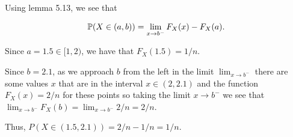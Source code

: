 

Using lemma 5.13, we see that 

\[
    \P(X \in (a, b)) = \lim_{x \to b^{-} } F_{X} (x) - F_{X} (a)  
.\] 

Since $ a = 1.5 \in [1,2)$, we have that $ F_{X} (1.5) = 1/n$. 

Since $ b = 2.1$, as we approach $ b$ from the left in the limit $ \lim_{x \to b^{-} } $ there are
some values $ x$ that are in the interval $ x \in (2,2.1)$ and the function $ F_{X} (x) = 2/n$ for these
points so taking the limit $ x \to b^{-} $ we see that $ \lim_{x \to b^{-} } F_{X} (b) = \lim_{x \to
b^{-} } 2/n = 2/n$. 

Thus, $ P(X \in (1.5,2.1)) = 2/n - 1/n = 1/n$.
